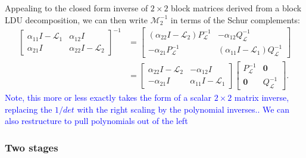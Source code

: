 \documentclass[a4paper,10pt]{article}
\newcommand{\tcb}{\textcolor{blue}}
\begin{document}
%
Appealing to the closed form inverse of $2\times 2$ block matrices derived from a block LDU decomposition,
we can then write $\mathcal{M}_2^{-1}$ in terms of the Schur complements:
%
\begin{align}
\begin{bmatrix} \alpha_{11} I - \mathcal{L}_1 & \alpha_{12}I \\ \alpha_{21}I & \alpha_{22}I - \mathcal{L}_2\end{bmatrix} ^{-1}
	& = \begin{bmatrix}  (\alpha_{22} I - \mathcal{L}_2 )P_{\mathcal{L}}^{-1} & -\alpha_{12}Q_{\mathcal{L}}^{-1} \\
		-\alpha_{21}P_{\mathcal{L}}^{-1} & (\alpha_{11} I - \mathcal{L}_1 )Q_{\mathcal{L}}^{-1} \end{bmatrix} \nonumber\\
& = \begin{bmatrix} \alpha_{22} I - \mathcal{L}_2  & -\alpha_{12}I \\ -\alpha_{21}I & \alpha_{11} I - \mathcal{L}_1 \end{bmatrix} 
	\begin{bmatrix} P_{\mathcal{L}}^{-1}  & \mathbf{0} \\ \mathbf{0} & Q_{\mathcal{L}}^{-1} \end{bmatrix}.\label{eq:Minv}
\end{align}
%
\tcb{Note, this more or less exactly takes the form of a scalar $2\times 2$ matrix inverse, replacing
the $1/det$ with the right scaling by the polynomial inverses.. We can also restructure to pull
polynomials out of the left }


\subsubsection{Two stages}
\end{document}
